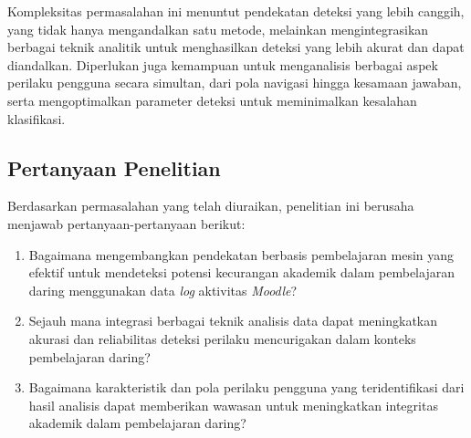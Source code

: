 Kompleksitas permasalahan ini menuntut pendekatan deteksi yang lebih canggih, yang tidak hanya mengandalkan satu metode, melainkan mengintegrasikan berbagai teknik analitik untuk menghasilkan deteksi yang lebih akurat dan dapat diandalkan. Diperlukan juga kemampuan untuk menganalisis berbagai aspek perilaku pengguna secara simultan, dari pola navigasi hingga kesamaan jawaban, serta mengoptimalkan parameter deteksi untuk meminimalkan kesalahan klasifikasi.

\subsection{Pertanyaan Penelitian}
\label{sec:definisiMasalah}
Berdasarkan permasalahan yang telah diuraikan, penelitian ini berusaha menjawab pertanyaan-pertanyaan berikut:
\begin{enumerate}
    \item Bagaimana mengembangkan pendekatan berbasis pembelajaran mesin yang efektif untuk mendeteksi potensi kecurangan akademik dalam pembelajaran daring menggunakan data \textit{log} aktivitas \textit{Moodle}?
    \item Sejauh mana integrasi berbagai teknik analisis data dapat meningkatkan akurasi dan reliabilitas deteksi perilaku mencurigakan dalam konteks pembelajaran daring?
    \item Bagaimana karakteristik dan pola perilaku pengguna yang teridentifikasi dari hasil analisis dapat memberikan wawasan untuk meningkatkan integritas akademik dalam pembelajaran daring?
\end{enumerate}

